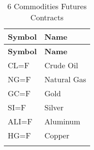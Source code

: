 \begin{longtable}{|l|l|}
\hline
\textbf{Symbol} & \textbf{Name}  \\ \midrule
\endfirsthead

\hline
\textbf{Symbol} & \textbf{Name} \\ \midrule
\endhead

\endfoot

\hline
CL=F & Crude Oil \\ \hline
NG=F & Natural Gas \\ \hline
GC=F & Gold \\ \hline
SI=F & Silver \\ \hline
ALI=F & Aluminum \\ \hline
HG=F & Copper \\ \hline
\caption{6 Commodities Futures Contracts}
\label{tab:commodities}
\end{longtable}
